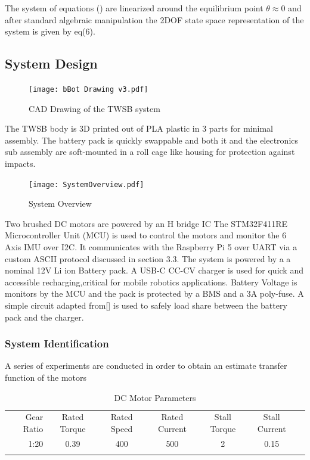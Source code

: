     The system of equations () are linearized around the equilibrium point $\theta\approx 0$  and after standard algebraic manipulation the 
    2DOF state space representation of the system is given by eq(6).


   
    \pagebreak{}

    \subsection{System Design}
        \begin{figure}[H]
            \texttt{[image: bBot Drawing v3.pdf]}
            \caption{CAD Drawing of the TWSB system}
        \end{figure}

        The TWSB body is 3D printed out of PLA plastic in 3 parts for minimal assembly.
        The battery pack is quickly swappable and both it and the electronics sub assembly 
        are soft-mounted in a roll cage like housing for protection against impacts. 
        \begin{figure}[H]
            \texttt{[image: SystemOverview.pdf]}
            \caption{System Overview}
        \end{figure}

        Two brushed DC motors are powered by an H bridge IC 
        The STM32F411RE Microcontroller Unit (MCU) is used to control the 
        motors and monitor the 6 Axis IMU over I2C. It communicates with the 
        Raspberry Pi 5 over UART via a custom ASCII protocol discussed in section 3.3. 
        The system is powered by a a nominal 12V Li ion Battery pack. A USB-C CC-CV charger is used for quick 
        and accessible recharging,critical for mobile robotics applications. Battery Voltage is monitors by the MCU
        and the pack is protected by a BMS and a 3A poly-fuse.
        A simple circuit adapted from[] is used to safely load share between the battery pack and the charger.


        \pagebreak{}
        \subsubsection{System Identification}


        A series of experiments are conducted in order to obtain an estimate transfer function of the motors
        
        \begin{table}
                \begin{tabular}{|r|c|c|c|c|c|c|}
                    \vline 
                    Gear Ratio & Rated Torque & Rated Speed & Rated Current & Stall Torque & Stall Current \\
                     1:20 & 0.39 & 400 & 500 & 2 & 0.15 \\
                    \vline
                \end{tabular}
                \caption{DC Motor Parameters}
        \end{table}


